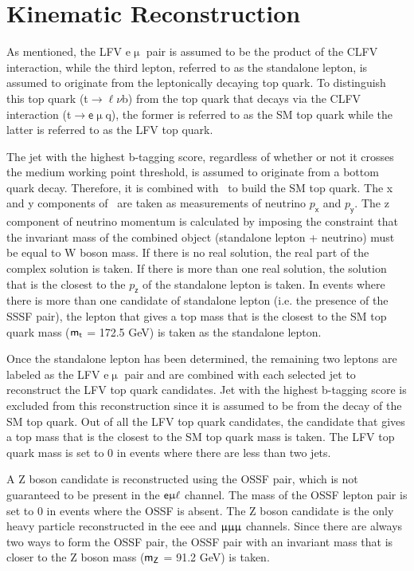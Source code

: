 \section{Kinematic Reconstruction}
\label{sec:Kin}

As mentioned, the LFV e$\upmu$ pair is assumed to be the product of the \ac{CLFV} interaction, while the third lepton, referred to as the standalone lepton, is assumed to originate from the leptonically decaying top quark. To distinguish this top quark (t$\rightarrow\ell\nu$b) from the top quark that decays via the \ac{CLFV} interaction (t$\rightarrow\textsf{e}\upmu$q), the former is referred to as the \ac{SM} top quark while the latter is referred to as the LFV top quark. 

The jet with the highest b-tagging score, regardless of whether or not it crosses the medium working point threshold, is assumed to originate from a bottom quark decay. Therefore, it is combined with \MET~to build the \ac{SM} top quark. The x and y components of \MET~are taken as measurements of neutrino $p_{\textsf{x}}$ and $p_{\textsf{y}}$. The z component of neutrino momentum is calculated by imposing the constraint that the invariant mass of the combined object (standalone lepton + neutrino) must be equal to W boson mass. If there is no real solution, the real part of the complex solution is taken. If there is more than one real solution, the solution that is the closest to the $p_{\textsf{z}}$ of the standalone lepton is taken. In events where there is more than one candidate of standalone lepton (i.e. the presence of the \ac{SSSF} pair), the lepton that gives a top mass that is the closest to the \ac{SM} top quark mass ($\textsf{m}_{\textsf{t}}$ = 172.5 GeV) is taken as the standalone lepton.

Once the standalone lepton has been determined, the remaining two leptons are labeled as the LFV e$\upmu$ pair and are combined with each selected jet to reconstruct the LFV top quark candidates. Jet with the highest b-tagging score is excluded from this reconstruction since it is assumed to be from the decay of the \ac{SM} top quark. Out of all the LFV top quark candidates, the candidate that gives a top mass that is the closest to the \ac{SM} top quark mass is taken. The LFV top quark mass is set to 0 in events where there are less than two jets.

A Z boson candidate is reconstructed using the \ac{OSSF} pair, which is not guaranteed to be present in the $\textsf{e}\upmu\ell$ channel. The mass of the \ac{OSSF} lepton pair is set to 0 in events where the \ac{OSSF} is absent. The Z boson candidate is the only heavy particle reconstructed in the eee and $\upmu\upmu\upmu$ channels. Since there are always two ways to form the \ac{OSSF} pair, the \ac{OSSF} pair with an invariant mass that is closer to the Z boson mass ($\textsf{m}_{\textsf{Z}}$ = 91.2 GeV) is taken. 

